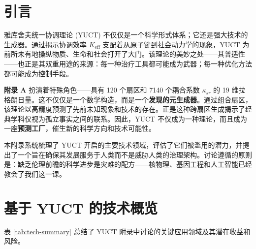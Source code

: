 \documentclass[12pt,a4paper]{article}
\theoremstyle{remark}
\newcommand{\Keff}{K_{\mathrm{eff}}}
\begin{document}
	\tableofcontents
	\newpage
	
	\section{引言}
	\label{sec:intro}
	
	雅库舍夫统一协调理论 (YUCT) 不仅仅是一个科学形式体系；它还是强大技术的生成器。通过揭示协调效率 \(\Keff\) 支配着从原子键到社会动力学的现象，YUCT 为前所未有地操纵物质、生命和社会打开了大门。该理论的美妙之处——其普适性——也正是其双重用途的来源：每一种治疗工具都可能成为武器；每一种优化方法都可能成为控制手段。
	
	\textbf{附录 A} 扮演着特殊角色——具有 120 个扇区和 7140 个耦合系数 \(\kappa_{sr}\) 的 19 维拉格朗日量。这不仅仅是一个数学构造，而是一个\textbf{发现的元生成器}。通过组合扇区，该理论以高精度预测了先前未知现象和技术的存在。正是这种跨扇区生成揭示了经典学科仅视为孤立事实之间的联系。因此，YUCT 不仅成为一种理论，而且成为一座\textbf{预测工厂}，催生新的科学方向和技术可能性。
	
	本附录系统梳理了 YUCT 开启的主要技术领域，评估了它们被滥用的潜力，并提出了一个旨在确保其发展服务于人类而不是威胁人类的治理架构。讨论遵循的原则是：缺乏伦理前瞻的科学进步是灾难的配方——核物理、基因工程和人工智能已经教会了我们这一课。
	
	\section{基于 YUCT 的技术概览}
	\label{sec:overview}
	
	表 \ref{tab:tech-summary} 总结了 YUCT 附录中讨论的关键应用领域及其潜在收益和风险。
	
\end{document}
